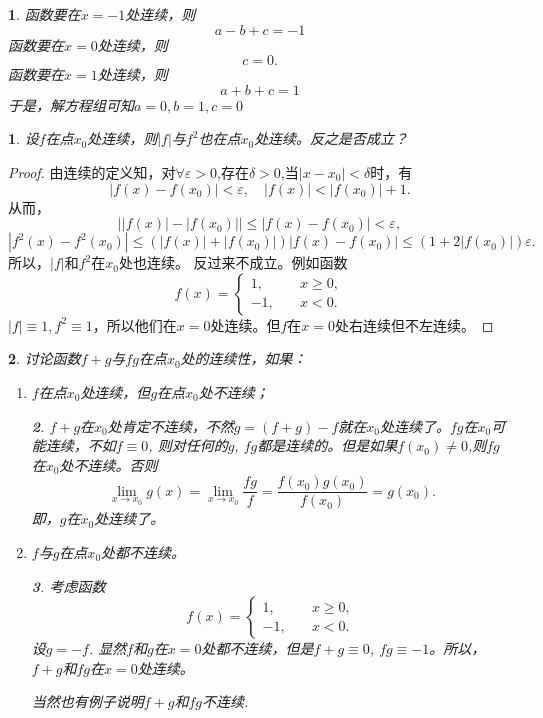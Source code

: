 \documentclass[utf8]{book}
\newtheorem{example}{}[section]             %
\newtheorem{solution}{}
\begin{document}
\begin{solution}函数要在$x=-1$处连续，则
$$a-b+c=-1$$
函数要在$x=0$处连续，则$$c=0.$$
函数要在$x=1$处连续，则$$a+b+c=1$$
于是，解方程组可知$a=0,b=1,c=0$
\end{solution}
\begin{example}
设$f$在点$x_0$处连续，则$|f|$与$f^2$也在点$x_0$处连续。反之是否成立？
\end{example}
\begin{proof}由连续的定义知，对$\forall \varepsilon > 0$,存在$\delta>0$,当$|x-x_0|<\delta$时，有
$$|f(x)-f(x_0)|<\varepsilon,\quad |f(x)| < |f(x_0)| + 1.$$
从而，
$$\left||f(x)|-|f(x_0)|\right|\leq \left|f(x)-f(x_0)\right| < \varepsilon,$$
$$|f^2(x)-f^2(x_0)|\leq (|f(x)|+|f(x_0)|)\left|f(x)-f(x_0)\right|\leq  (1+2|f(x_0)|)\varepsilon.$$
所以，$|f|$和$f^2$在$x_0$处也连续。
反过来不成立。例如函数
$$f(x) = 
\begin{cases}
1,\quad &x\geq 0,\\
-1,\quad &x < 0.
\end{cases}$$
$|f|\equiv 1, f^2\equiv 1$，所以他们在$x=0$处连续。但$f$在$x=0$处右连续但不左连续。
\end{proof}
\begin{example}讨论函数$f+g$与$fg$在点$x_0$处的连续性，如果：
\renewcommand\labelenumi{\normalfont(\theenumi)}
\begin{enumerate}
\item $f$在点$x_0$处连续，但$g$在点$x_0$处不连续；
\begin{solution}
$f+g$在$x_0$处肯定不连续，不然$g=(f+g)-f$就在$x_0$处连续了。$fg$在$x_0$可能连续，不如$f\equiv 0$, 则对任何的$g$, $fg$都是连续的。但是如果$f(x_0)\neq 0$,则$fg$在$x_0$处不连续。否则$$\displaystyle\lim_{x\to x_0}g(x)=\displaystyle\lim_{x\to x_0}\frac{fg}{f}=\frac{f(x_0)g(x_0)}{f(x_0)}=g(x_0).$$
即，$g$在$x_0$处连续了。
\end{solution}
\item $f$与$g$在点$x_0$处都不连续。
\begin{solution}考虑函数$$f(x) = 
\begin{cases}
1,\quad &x\geq 0,\\
-1,\quad &x < 0.
\end{cases}$$
设$g=-f$. 显然$f$和$g$在$x=0$处都不连续，但是$f+g\equiv 0$, $fg\equiv -1$。所以，$f+g$和$fg$在$x=0$处连续。

当然也有例子说明$f+g$和$fg$不连续.
\end{solution}
\end{enumerate}
\end{example}
\end{document}
